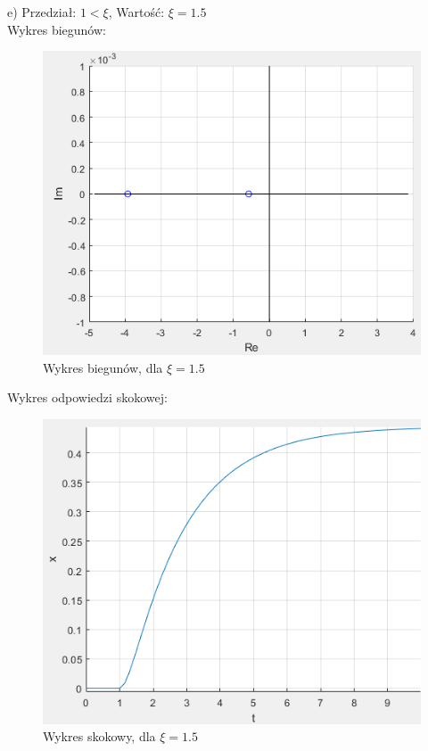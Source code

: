 \documentclass{article}
\begin{document}
\begin{flushleft}
 
 \newpage
 
 
 e) Przedział: $1<\xi$, Wartość: $\xi=1.5$\\
  Wykres biegunów:\\
 \begin{figure}[h!]
    \centering
    \includegraphics[scale=0.6]{biegunykis1,5.png}
    \caption{Wykres biegunów, dla $\xi=1.5$}
    \label{fig:bieguny_ksi_1_5}
 \end{figure}
 
 
 Wykres odpowiedzi skokowej:\\
 \begin{figure}[h!]
    \centering
    \includegraphics[scale=0.6]{skokksi1_5.png}
    \caption{Wykres skokowy, dla $\xi=1.5$}
    \label{fig:ksi_1_5}
 \end{figure}
\end{flushleft}
\end{document}
